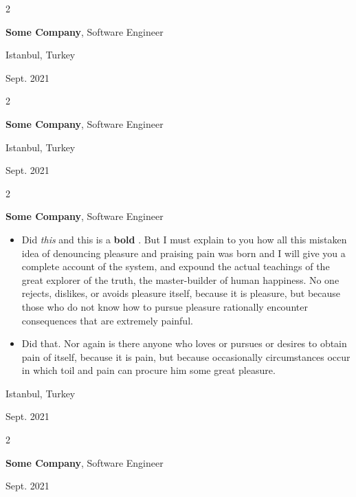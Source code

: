 \documentclass[10pt, letterpaper]{article}
\newenvironment{highlights}{
    \begin{itemize}[
        topsep=0.10 cm,
        parsep=0.10 cm,
        partopsep=0pt,
        itemsep=0pt,
        leftmargin=0.4 cm + 10pt
    ]
}{
    \end{itemize}
} %
\newenvironment{twocolentry}[2][]{
    \onecolentry
    \def\secondColumn{#2}
    \setcolumnwidth{\fill, 4.5 cm}
    \begin{paracol}{2}
}{
    \switchcolumn \raggedleft \secondColumn
    \end{paracol}
    \endonecolentry
} %
\let\hrefWithoutArrow\href
\renewcommand{\href}[2]{\hrefWithoutArrow{#1}{\mbox{\ifthenelse{\equal{#2}{}}{ }{#2 }\raisebox{.15ex}{\footnotesize \faExternalLink*}}}}
\begin{document}
        \vspace{0.2 cm}

        \begin{twocolentry}{
            Istanbul, Turkey

        Sept. 2021
        }
            \textbf{Some \textnormal{Company}}, Software Engineer
        \end{twocolentry}


        \vspace{0.2 cm}

        \begin{twocolentry}{
            Istanbul, Turkey

        Sept. 2021
        }
            \textbf{Some \textnormal{Company}}, Software Engineer
        \end{twocolentry}


        \vspace{0.2 cm}

        \begin{twocolentry}{
            Istanbul, Turkey

        Sept. 2021
        }
            \textbf{Some \textnormal{Company}}, Software Engineer
            \begin{highlights}
                \item Did \textit{this} and this is a \textbf{bold} \href{https://example.com}{link}. But I must explain to you how all this mistaken idea of denouncing pleasure and praising pain was born and I will give you a complete account of the system, and expound the actual teachings of the great explorer of the truth, the master-builder of human happiness. No one rejects, dislikes, or avoids pleasure itself, because it is pleasure, but because those who do not know how to pursue pleasure rationally encounter consequences that are extremely painful.
                \item Did that. Nor again is there anyone who loves or pursues or desires to obtain pain of itself, because it is pain, but because occasionally circumstances occur in which toil and pain can procure him some great pleasure.
            \end{highlights}
        \end{twocolentry}


        \vspace{0.2 cm}

        \begin{twocolentry}{
            Sept. 2021
        }
            \textbf{Some \textnormal{Company}}, Software Engineer
        \end{twocolentry}
\end{document}
